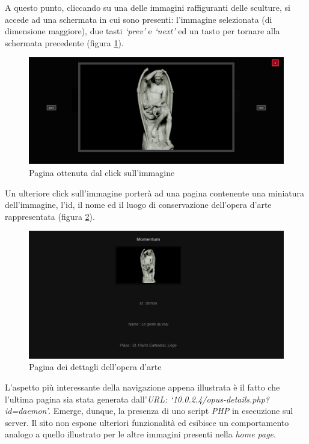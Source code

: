 A questo punto, cliccando su una delle immagini raffiguranti delle sculture, si accede ad una schermata in cui sono presenti: l'immagine selezionata (di dimensione maggiore), due tasti \emph{`prev'} e \emph{`next'} ed un tasto per tornare alla schermata precedente (figura \ref{fig:click}).
\begin{figure}[h]
    \centering
    \includegraphics[scale=0.3]{capitoli/images/click.png}
    \caption{Pagina ottenuta dal click sull'immagine}
    \label{fig:click}
\end{figure}

Un ulteriore click sull'immagine porterà ad una pagina contenente una miniatura dell'immagine, l'id, il nome ed il luogo di conservazione dell'opera d'arte rappresentata (figura \ref{fig:img_details}). 
\begin{figure}[h]
    \centering
    \includegraphics[scale=0.5]{capitoli/images/img_details.png}
    \caption{Pagina dei dettagli dell'opera d'arte}
    \label{fig:img_details}
\end{figure}
L'aspetto più interessante della navigazione appena illustrata è il fatto che l'ultima pagina sia stata generata dall'\emph{URL: `10.0.2.4/opus-details.php?id=daemon'}. Emerge, dunque, la presenza di uno script \emph{PHP} in esecuzione sul server. Il sito non espone ulteriori funzionalità ed esibisce un comportamento analogo a quello illustrato per le altre immagini presenti nella \emph{home page}.
